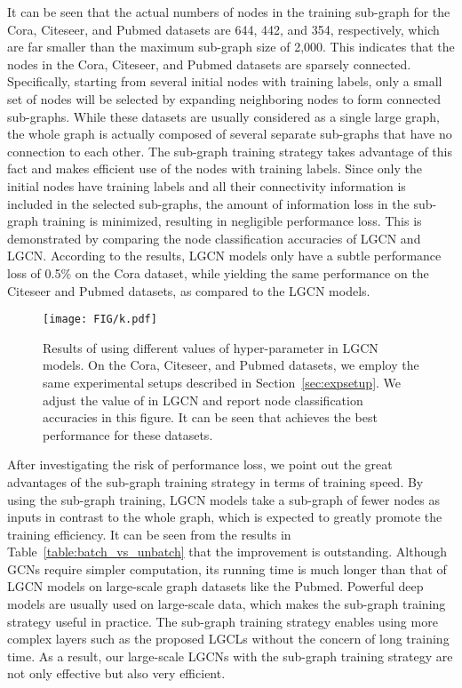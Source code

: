 \documentclass[sigconf]{acmart}
\begin{document}
It can be seen that the actual numbers of nodes in the training
sub-graph for the Cora, Citeseer, and Pubmed datasets are 644, 442,
and 354, respectively, which are far smaller than the maximum
sub-graph size of 2,000. This indicates that the nodes in the Cora,
Citeseer, and Pubmed datasets are sparsely connected. Specifically,
starting from several initial nodes with training labels, only a
small set of nodes will be selected by expanding neighboring nodes
to form connected sub-graphs. While these datasets are usually
considered as a single large graph, the whole graph is actually
composed of several separate sub-graphs that have no connection to
each other. The sub-graph training strategy takes advantage of this
fact and makes efficient use of the nodes with training labels.
Since only the initial nodes have training labels and all their
connectivity information is included in the selected sub-graphs, the
amount of information loss in the sub-graph training is minimized,
resulting in negligible performance loss. This is demonstrated by
comparing the node classification accuracies of LGCN and
LGCN. According to the results, LGCN models only
have a subtle performance loss of 0.5\% on the Cora dataset, while
yielding the same performance on the Citeseer and Pubmed datasets,
as compared to the LGCN models.


\begin{figure}[t] \texttt{[image: FIG/k.pdf]}
\caption{Results of using different values of hyper-parameter  in
LGCN models. On the Cora, Citeseer, and Pubmed datasets, we employ
the same experimental setups described in
Section~\ref{sec:expsetup}. We adjust the value of  in
LGCN and report node classification accuracies in this
figure. It can be seen that  achieves the best performance for
these datasets.} \label{fig:k_exp} \end{figure}


After investigating the risk of performance loss, we point out the
great advantages of the sub-graph training strategy in terms of
training speed. By using the sub-graph training, LGCN models
take a sub-graph of fewer nodes as inputs in contrast to the whole
graph, which is expected to greatly promote the training efficiency.
It can be seen from the results in
Table~\ref{table:batch_vs_unbatch} that the improvement is
outstanding. Although GCNs require simpler computation, its running
time is much longer than that of LGCN models on large-scale graph
datasets like the Pubmed. Powerful deep models are usually used on
large-scale data, which makes the sub-graph training strategy useful
in practice. The sub-graph training strategy enables using more
complex layers such as the proposed LGCLs without the concern of
long training time. As a result, our large-scale LGCNs with the
sub-graph training strategy are not only effective but also very
efficient.
\end{document}
